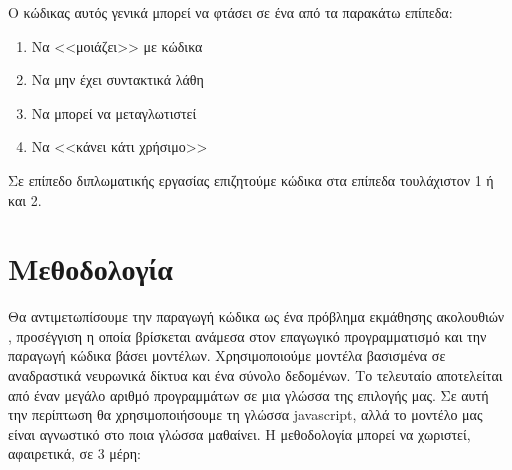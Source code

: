 Ο κώδικας αυτός γενικά μπορεί να φτάσει σε ένα από τα παρακάτω επίπεδα:

\begin{enumerate}
\item Να <<μοιάζει>> με κώδικα
\item Να μην έχει συντακτικά λάθη
\item Να μπορεί να μεταγλωτιστεί
\item Να <<κάνει κάτι χρήσιμο>>
\end{enumerate}

Σε επίπεδο διπλωματικής εργασίας επιζητούμε κώδικα στα επίπεδα τουλάχιστον 1 ή και 2.

\section{Μεθοδολογία}
Θα αντιμετωπίσουμε την παραγωγή κώδικα ως ένα πρόβλημα εκμάθησης ακολουθιών , προσέγγιση η οποία βρίσκεται ανάμεσα στον επαγωγικό προγραμματισμό και την παραγωγή κώδικα βάσει μοντέλων.
Χρησιμοποιούμε μοντέλα βασισμένα σε αναδραστικά νευρωνικά δίκτυα και ένα σύνολο δεδομένων. 
Το τελευταίο αποτελείται από έναν μεγάλο αριθμό προγραμμάτων σε μια γλώσσα της επιλογής μας. Σε αυτή την περίπτωση θα χρησιμοποιήσουμε τη γλώσσα javascript, αλλά το μοντέλο μας είναι αγνωστικό στο ποια γλώσσα μαθαίνει.
Η μεθοδολογία μπορεί να χωριστεί, αφαιρετικά, σε 3 μέρη:

